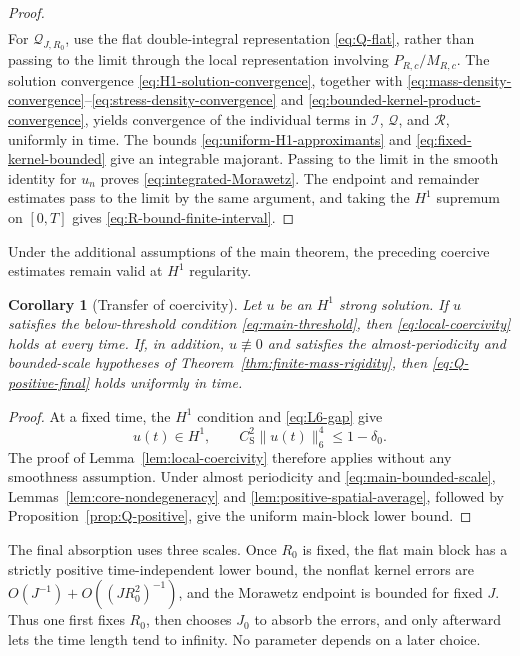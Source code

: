 \documentclass{interact}
\numberwithin{equation}{section}
\theoremstyle{plain}
\newtheorem{corollary}[theorem]{Corollary}
\theoremstyle{definition}
\theoremstyle{remark}
\newcommand{\cS}{C_{\mathrm S}}
\begin{document}
\begin{proof}
\begin{align}
\end{align}
For $\mathcal Q_{J,R_0}$, use the flat double-integral representation \eqref{eq:Q-flat}, rather than passing to the limit through the local representation involving $P_{R,c}/M_{R,c}$. The solution convergence \eqref{eq:H1-solution-convergence}, together with \eqref{eq:mass-density-convergence}--\eqref{eq:stress-density-convergence} and \eqref{eq:bounded-kernel-product-convergence}, yields convergence of the individual terms in $\mathcal I$, $\mathcal Q$, and $\mathcal R$, uniformly in time. The bounds \eqref{eq:uniform-H1-approximants} and \eqref{eq:fixed-kernel-bounded} give an integrable majorant. Passing to the limit in the smooth identity for $u_n$ proves \eqref{eq:integrated-Morawetz}. The endpoint and remainder estimates pass to the limit by the same argument, and taking the $H^1$ supremum on $[0,T]$ gives \eqref{eq:R-bound-finite-interval}.
\end{proof}

Under the additional assumptions of the main theorem, the preceding coercive estimates remain valid at $H^1$ regularity.

\begin{corollary}[Transfer of coercivity]\label{cor:coercivity-low-regularity}
Let $u$ be an $H^1$ strong solution. If $u$ satisfies the below-threshold condition \eqref{eq:main-threshold}, then \eqref{eq:local-coercivity} holds at every time. If, in addition, $u\not\equiv0$ and satisfies the almost-periodicity and bounded-scale hypotheses of Theorem~\ref{thm:finite-mass-rigidity}, then \eqref{eq:Q-positive-final} holds uniformly in time.
\end{corollary}

\begin{proof}
At a fixed time, the $H^1$ condition and \eqref{eq:L6-gap} give
\[
 u(t)\in H^1,
 \qquad
 \cS^2\|u(t)\|_6^4\le1-\delta_0.
\]
The proof of Lemma~\ref{lem:local-coercivity} therefore applies without any smoothness assumption. Under almost periodicity and \eqref{eq:main-bounded-scale}, Lemmas~\ref{lem:core-nondegeneracy} and \ref{lem:positive-spatial-average}, followed by Proposition~\ref{prop:Q-positive}, give the uniform main-block lower bound.
\end{proof}

The final absorption uses three scales. Once $R_0$ is fixed, the flat main block has a strictly positive time-independent lower bound, the nonflat kernel errors are $O(J^{-1})+O((JR_0^2)^{-1})$, and the Morawetz endpoint is bounded for fixed $J$. Thus one first fixes $R_0$, then chooses $J_0$ to absorb the errors, and only afterward lets the time length tend to infinity. No parameter depends on a later choice.
\end{document}
